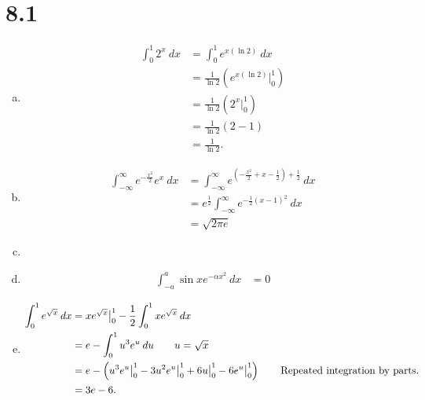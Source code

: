 \documentclass[10pt]{mypackage}
\begin{document}
\RaggedRight
\section{8.1}%
\begin{enumerate}[(a)]
  \item 
    \begin{align*}
      \int_{0}^{1} 2^x\:dx &= \int_{0}^{1} e^{x\left(\ln 2\right)}\:dx\\
                           &= \frac{1}{\ln 2}\left(e^{x\left(\ln 2\right)}\bigr\vert_{0}^{1}\right)\tag*{$u = x\left(\ln 2\right)$}\\
                           &= \frac{1}{\ln 2}\left(2^{x}\bigr\vert_{0}^{1}\right)\\
                           &= \frac{1}{\ln 2}\left(2-1\right)\\
                           &= \frac{1}{\ln 2}.
    \end{align*}
  \item
    \begin{align*}
      \int_{-\infty}^{\infty} e^{-\frac{x^2}{2}}e^{x}\:dx &= \int_{-\infty}^{\infty} e^{\left(-\frac{x^2}{2} + x - \frac{1}{2} \right)+ \frac{1}{2}}\:dx\tag*{Completing the square.}\\
                                                          &= e^{\frac{1}{2}}\int_{-\infty}^{\infty}e^{-\frac{1}{2}\left(x-1\right)^2} \:dx\\
                                                          &= \sqrt{2\pi e}
    \end{align*}
  \item 
  \item 
    \begin{align*}
      \int_{-a}^{a} \sin x e^{-\alpha x^2}\:dx &= 0 \tag*{Even/odd.}
    \end{align*}
  \item 
    \begin{align*}
      \int_{0}^{1} e^{\sqrt{x}}\:dx &= xe^{\sqrt{x}}\bigr\vert_{0}^{1} - \frac{1}{2}\int_{0}^{1} xe^{\sqrt{x}}\:dx\\
                                    &= e - \int_{0}^{1} u^3e^{u}\:du\tag*{$u = \sqrt{x}$}\\
                                    &= e - \left(u^3e^{u}\bigr\vert_{0}^{1} - 3u^2e^{u}\bigr\vert_{0}^{1} + 6u\bigr\vert_{0}^{1} - 6e^{u}\bigr\vert_{0}^{1}\right)\tag*{Repeated integration by parts.}\\
                                    &= 3e-6.
    \end{align*}

\end{enumerate}
\end{document}

